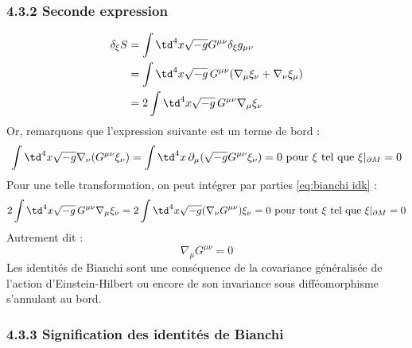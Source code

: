 \subsubsection{4.3.2 Seconde expression}
\begin{align}
     \delta_{\xi}S &= \int \td ^4x \sqrt{-g}G^{\mu \nu}\delta_{\xi}g_{\mu \nu}\\
     &=\int \td ^4x \sqrt{-g} \, G^{\mu \nu}(\nabla_{\mu}\xi_{\nu} + \nabla_{\nu}\xi_{\mu})\\
     \label{eq:bianchi idk}
     &=2\int \td ^4x \sqrt{-g}\, G^{\mu \nu}\nabla_{\mu}\xi_{\nu}
\end{align}
Or, remarquons que l'expression suivante est un terme de bord :
\begin{equation}
    \int \td ^4x \sqrt{-g}\nabla_{\nu}(G^{\mu \nu} \xi_{\nu}) =  \int \td ^4x \, \partial_{\mu}(\sqrt{-g}G^{\mu \nu} \xi_{\nu}) = 0 \text{ pour } \xi \text{ tel que }\xi|_{\partial M} = 0
\end{equation}
Pour une telle transformation, on peut intégrer par parties \ref{eq:bianchi idk} :
\begin{equation}
    2\int \td ^4x \sqrt{-g} \, G^{\mu \nu}\nabla_{\mu}\xi_{\nu} = 2\int \td ^4x \sqrt{-g}(\nabla_{\nu}G^{\mu \nu})\xi_{\nu} = 0 \text{ pour tout } \xi \text{ tel que }\xi|_{\partial M} = 0
\end{equation}
Autrement dit :
\begin{equation}
    \boxed{\nabla_{\mu}G^{\mu \nu} = 0}
\end{equation}
Les identités de Bianchi sont une conséquence de la covariance généralisée de l'action d'Einstein-Hilbert ou encore de son invariance sous difféomorphisme s'annulant au bord. 

\subsubsection{4.3.3 Signification des identités de Bianchi}

